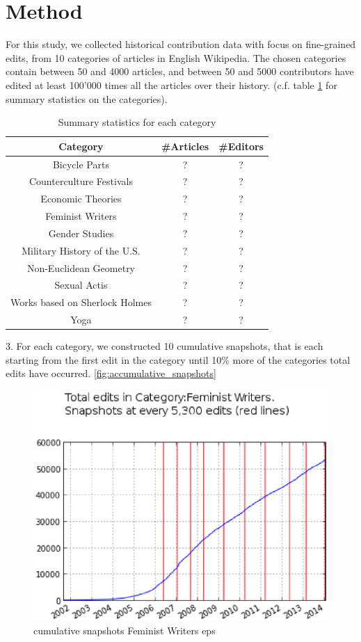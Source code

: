\documentclass{acm_proc_article-sp}
\begin{document}
\section{Method}
For this study, we collected historical contribution data with focus on fine-grained edits, from 10 categories of articles in English Wikipedia. The chosen categories contain between 50 and 4000 articles, and between 50 and 5000 contributors have edited at least 100'000 times all the articles over their history. (c.f. table \ref{tab:statistics} for summary statistics on the categories). 

\begin{table}
\centering
\caption{Summary statistics for each category}
\begin{tabular}{|c|c|c|} \hline
{\bf Category} & {\bf \#Articles} & {\bf \#Editors} \\ \hline
Bicycle Parts &   ? & ? \\ \hline
Counterculture Festivals &   ? & ? \\ \hline
Economic Theories &   ? & ? \\ \hline
Feminist Writers &   ? & ? \\ \hline
Gender Studies & ? & ?  \\ \hline
Military History of the U.S. & ? & ?  \\ \hline
Non-Euclidean Geometry & ? & ?  \\ \hline
Sexual Actis & ? & ?  \\ \hline
Works based on Sherlock Holmes & ? & ?  \\ \hline
Yoga & ? & ?  \\ \hline
\end{tabular}
\label{tab:statistics}
\end{table}


3. For each category, we constructed 10 cumulative snapshots, that is each starting from the first edit in the category until 10\% more of the categories total edits have occurred. \ref{fig:accumulative_snapshots}

\begin{figure}[!t]
\centering
\includegraphics[width=0.9\columnwidth]{Figures/cumulative_snapshots_Feminist_Writers.eps}
\caption{cumulative snapshots Feminist Writers eps }
\label{fig:figure1}
\end{figure}
\end{document}

